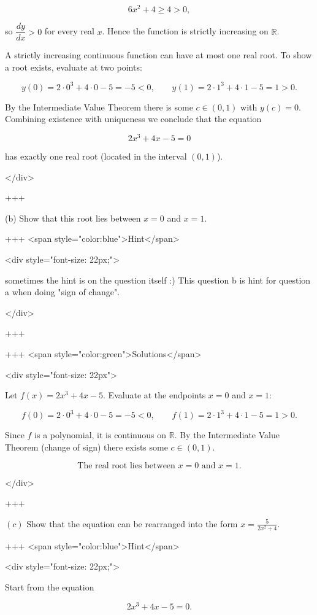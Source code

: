 $$
6x^{2}+4\ge 4>0,
$$

so $\dfrac{dy}{dx}>0$ for every real $x$. Hence the function is strictly increasing on $\mathbb{R}$.

A strictly increasing continuous function can have at most one real root. To show a root exists, evaluate at two points:

$$
y(0)=2\cdot 0^{3}+4\cdot 0-5=-5<0,
\qquad
y(1)=2\cdot 1^{3}+4\cdot 1-5=1>0.
$$

By the Intermediate Value Theorem there is some $c\in(0,1)$ with $y(c)=0$. Combining existence with uniqueness we conclude that the equation

$$
2x^{3}+4x-5=0
$$

has exactly one real root (located in the interval $(0,1)$).

</div>

+++

(b) Show that this root lies between $x=0$ and $x=1$.

+++ <span style="color:blue">Hint</span>

<div style="font-size: 22px;">

sometimes the hint is on the question itself :) This question b is hint for question a when doing "sign of change".

</div>

+++

+++ <span style="color:green">Solutions</span>

<div style="font-size: 22px">

Let $f(x)=2x^{3}+4x-5$. Evaluate at the endpoints $x=0$ and $x=1$:

$$
f(0)=2\cdot 0^{3}+4\cdot 0-5=-5<0,
\qquad
f(1)=2\cdot 1^{3}+4\cdot 1-5=1>0.
$$

Since $f$ is a polynomial, it is continuous on $\mathbb{R}$. By the Intermediate Value Theorem (change of sign) there exists some $c\in(0,1)$.

$$
\boxed{\text{The real root lies between }x=0\text{ and }x=1.}
$$

</div>

+++

\((c)\) Show that the equation can be rearranged into the form $x=\frac{5}{2 x^{2}+4}$.

+++ <span style="color:blue">Hint</span>

<div style="font-size: 22px;">

Start from the equation

$$
2x^{3}+4x-5=0.
$$

